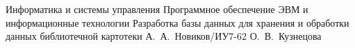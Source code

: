 \documentclass[a4paper]{bmstu}
\begin{document}
\makecourseworktitle
    {Информатика и системы управления}
    {Программное обеспечение ЭВМ и информационные технологии}
    {Разработка базы данных для хранения и обработки данных библиотечной картотеки}
    {А.~А.~Новиков/ИУ7-62}
    {О.~В.~Кузнецова}
    {}
    {}
    {}




\maketableofcontents










\makebibliography

\end{document}
